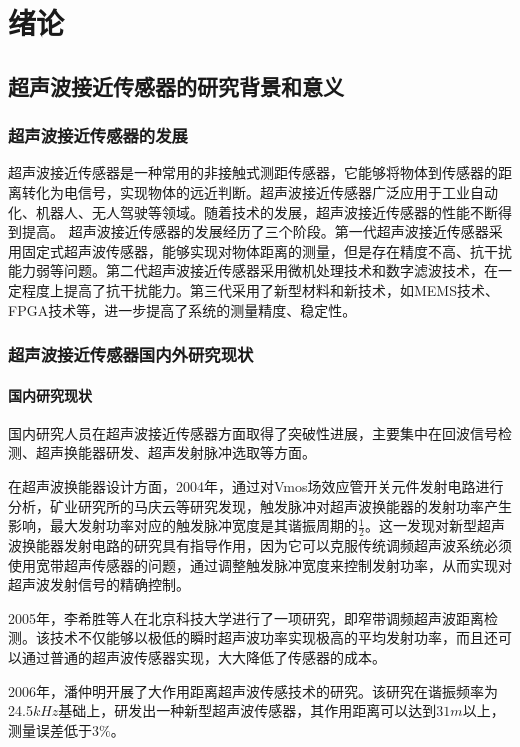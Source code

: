 	\newpage
	\section{绪论}
    \subsection{超声波接近传感器的研究背景和意义}
    \subsubsection{超声波接近传感器的发展}
    超声波接近传感器是一种常用的非接触式测距传感器，它能够将物体到传感器的距离转化为电信号，实现物体的远近判断。超声波接近传感器广泛应用于工业自动化、机器人、无人驾驶等领域。随着技术的发展，超声波接近传感器的性能不断得到提高。    
    超声波接近传感器的发展经历了三个阶段。第一代超声波接近传感器采用固定式超声波传感器，能够实现对物体距离的测量，但是存在精度不高、抗干扰能力弱等问题。第二代超声波接近传感器采用微机处理技术和数字滤波技术，在一定程度上提高了抗干扰能力。第三代采用了新型材料和新技术，如MEMS技术、FPGA技术等，进一步提高了系统的测量精度、稳定性。
    \subsubsection{超声波接近传感器国内外研究现状}
    \paragraph{国内研究现状}
	国内研究人员在超声波接近传感器方面取得了突破性进展，主要集中在回波信号检测、超声换能器研发、超声发射脉冲选取等方面。
	
	在超声波换能器设计方面，2004年，通过对Vmos场效应管开关元件发射电路进行分析，矿业研究所的马庆云等研究发现，触发脉冲对超声波换能器的发射功率产生影响，最大发射功率对应的触发脉冲宽度是其谐振周期的$\frac{1}{2}$。这一发现对新型超声波换能器发射电路的研究具有指导作用，因为它可以克服传统调频超声波系统必须使用宽带超声传感器的问题，通过调整触发脉冲宽度来控制发射功率，从而实现对超声波发射信号的精确控制。
	
	2005年，李希胜等人在北京科技大学进行了一项研究，即窄带调频超声波距离检测。该技术不仅能够以极低的瞬时超声波功率实现极高的平均发射功率，而且还可以通过普通的超声波传感器实现，大大降低了传感器的成本。
	
	2006年，潘仲明开展了大作用距离超声波传感技术的研究。该研究在谐振频率为24.5$kHz$基础上，研发出一种新型超声波传感器，其作用距离可以达到$31m$以上，测量误差低于$3\%$。
		
